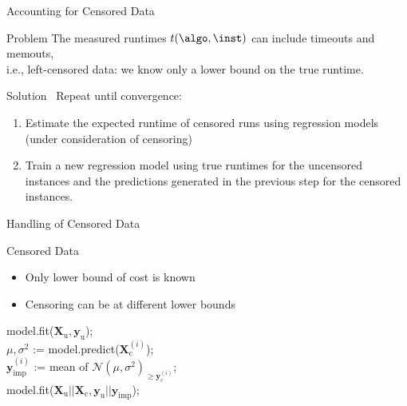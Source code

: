 % 
\begin{frame}[c]{Accounting for Censored Data}

\begin{block}{Problem}
The measured runtimes $t(\algo, \inst)$ can include timeouts and memouts,\\
i.e., left-censored data: we know only a lower bound on the true runtime.
\end{block}

\bigskip
\pause

\begin{block}{Solution~}
Repeat until convergence:
\begin{enumerate}
  \item Estimate the expected runtime of censored runs using regression models (under consideration of censoring)
  \item Train a new regression model using true runtimes for the uncensored instances and the
predictions generated in the previous step for the censored instances.
\end{enumerate}
\end{block}


\end{frame}
\begin{frame}[c]{Handling of Censored Data}

\begin{block}{Censored Data}
\begin{itemize}
  \item Only lower bound of cost is known
  \item Censoring can be at different lower bounds
\end{itemize}
\end{block}

\pause

\begin{algorithm}[H]
\BlankLine
model.fit($\mathbf{X}_{\text{u}}, \mathbf{y}_{\text{u}}$);\\
 {
	 {
		$\mu,\sigma^2$ := model.predict($\mathbf{X}_{\text{c}}^{(i)}$);\\
		$\mathbf{y}_{\text{imp}}^{(i)}$ := mean of $\mathcal{N}(\mu, \sigma^2)_{\geq \mathbf{y}_{\text{c}}^{(i)}}$;\\
	}
	model.fit($\mathbf{X}_{\text{u}} || \mathbf{X}_{\text{c}}, \mathbf{y}_{\text{u}} || \mathbf{y}_{\text{imp}}$);\\
}
\end{algorithm}

\end{frame}
